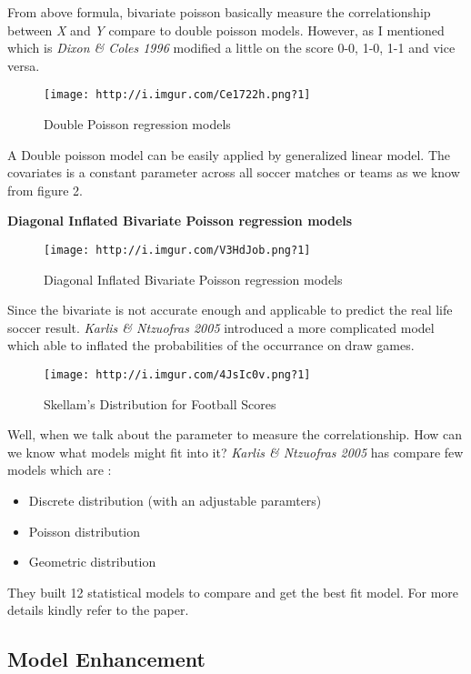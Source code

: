 \documentclass[article]{jss}
\providecommand{\tightlist}{%
  \setlength{\itemsep}{0pt}\setlength{\parskip}{0pt}}
\begin{document}
From above formula, bivariate poisson basically measure the
correlationship between \emph{X} and \emph{Y} compare to double poisson
models. However, as I mentioned which is \emph{Dixon \& Coles 1996}
modified a little on the score 0-0, 1-0, 1-1 and vice versa. \bigbreak

\begin{figure}[htbp]
\centering
\texttt{[image: http://i.imgur.com/Ce1722h.png?1]}
\caption{Double Poisson regression models}
\end{figure}

A Double poisson model can be easily applied by generalized linear
model. The covariates is a constant parameter across all soccer matches
or teams as we know from figure 2. \bigbreak

\textbf{Diagonal Inflated Bivariate Poisson regression models}

\begin{figure}[htbp]
\centering
\texttt{[image: http://i.imgur.com/V3HdJob.png?1]}
\caption{Diagonal Inflated Bivariate Poisson regression models}
\end{figure}

Since the bivariate is not accurate enough and applicable to predict the
real life soccer result. \emph{Karlis \& Ntzuofras 2005} introduced a
more complicated model which able to inflated the probabilities of the
occurrance on draw games.

\begin{figure}[htbp]
\centering
\texttt{[image: http://i.imgur.com/4JsIc0v.png?1]}
\caption{Skellam's Distribution for Football Scores}
\end{figure}

Well, when we talk about the parameter to measure the correlationship.
How can we know what models might fit into it? \emph{Karlis \& Ntzuofras
2005} has compare few models which are :

\begin{itemize}
\tightlist
\item
  Discrete distribution (with an adjustable paramters)
\item
  Poisson distribution
\item
  Geometric distribution
\end{itemize}

They built 12 statistical models to compare and get the best fit model.
For more details kindly refer to the paper.

\hypertarget{model-enhancement}{\subsection{Model
Enhancement}\label{model-enhancement}}
\end{document}
